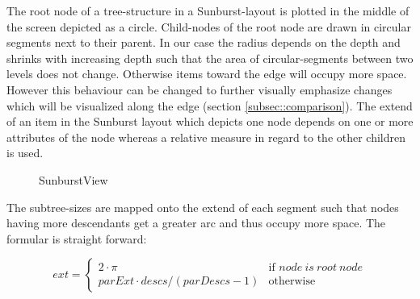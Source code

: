 \begin{itemize}
The root node of a tree-structure in a Sunburst-layout is plotted in the middle of the screen depicted as a circle. Child-nodes of the root node are drawn in circular segments next to their parent. In our case the radius depends on the depth and shrinks with increasing depth such that the area of circular-segments between two levels does not change. Otherwise items toward the edge will occupy more space. However this behaviour can be changed to further visually emphasize changes which will be visualized along the edge (section \ref{subsec::comparison}). The extend of an item in the Sunburst layout which depicts one node depends on one or more attributes of the node whereas a relative measure in regard to the other children is used.  

\begin{figure}[tb]
\caption{\label{fig:sunburstview} SunburstView}
\end{figure}

The subtree-sizes are mapped onto the extend of each segment such that nodes having more descendants get a greater arc and thus occupy more space. The formular is straight forward:

\begin{equation}
ext = \left\{ \begin{array}{cl}
2 \cdot \pi & \textrm{if }node\ is\ root\ node\\
parExt \cdot descs / (parDescs - 1) & \textrm{otherwise}\end{array}\right.
\end{equation}


\end{itemize}
